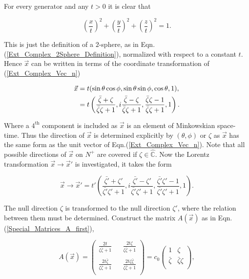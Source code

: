 For every generator and any $t>0$ it is clear that

\begin{equation*}
\left(\frac{x}{t}\right)^2 +\left(\frac{y}{t}\right)^2 +\left(\frac{z}{t}\right)^2 = 1.
\end{equation*}

\noindent This is just the definition of a $2$-sphere, as in Eqn.(\ref{Ext_Complex_2Sphere_Definition}), normalized with respect to a constant $t$. Hence $\vec{x}$ can be written in terms of the coordinate transformation of (\ref{Ext_Complex_Vec_n})

\begin{align}\nonumber
\vec{x} & = t(\sin{\theta}\cos{\phi}, \sin{\theta}\sin{\phi}, \cos{\theta}, 1), \\\label{Ext_Complex_vec_x_relations}
        & = t
\begin{Huge}
\left( \frac{\bar{\zeta} + \zeta}{\bar{\zeta}\zeta + 1}  ,i\frac{\bar{\zeta} - \zeta}{\bar{\zeta}\zeta + 1}, \frac{\bar{\zeta}\zeta - 1}{\bar{\zeta}\zeta + 1},1  \right).
\end{Huge}
\end{align}

\noindent Where a $4^{\text{th}}$ component is included as $\vec{x}$ is an element of Minkowskian space-time. Thus the direction of $\vec{x}$ is determined explicitly by $(\theta,\phi)$ or $\zeta$ as $\vec{x}$ has the same form as the unit vector of Eqn.(\ref{Ext_Complex_Vec_n}). Note that all possible directions of $\vec{x}$ on $N^{+}$ are covered if $\zeta \in \hat{\mathbb{C}}$. Now the Lorentz transformation $\vec{x} \rightarrow \vec{x}'$ is investigated, it takes the form  

\begin{equation*}
\vec{x} \rightarrow \vec{x}' = t'\left( \frac{\bar{\zeta'} + \zeta'}{\bar{\zeta'}\zeta' + 1}  ,i\frac{\bar{\zeta'} - \zeta'}{\bar{\zeta'}\zeta' + 1}, \frac{\bar{\zeta'}\zeta' - 1}{\bar{\zeta'}\zeta' + 1},1  \right).
\end{equation*}

\noindent The null direction $\zeta$ is transformed to the null direction $\zeta'$, where the relation between them must be determined. Construct the matrix $A(\vec{x})$ as in Eqn.(\ref{Special_Matrices_A_first}),

\begin{equation*}
A(\vec{x}) = 
\left(
\begin{array}{ccc}
\frac{2t}{\zeta\bar{\zeta}+1} & & \frac{2t\zeta}{\zeta\bar{\zeta}+1} \\
 & & \\
\frac{2t\bar{\zeta}}{\zeta\bar{\zeta}+1} & & \frac{2t\zeta\bar{\zeta}}{\zeta\bar{\zeta}+1} \\
\end{array}
\right)
=
c_0\left(
\begin{array}{cc}
1           & \zeta \\ 
\bar{\zeta} & \bar{\zeta}\zeta \\ 
\end{array}
\right),
\end{equation*}

